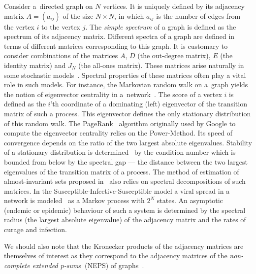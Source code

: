 \documentclass[a4paper]{article}
\theoremstyle{definition}
\begin{document}
Consider a~directed graph on \( N \) vertices.
It is uniquely defined by its
adjacency matrix
    \( A = (a_{ij}) \)
    of the size \( N\times N \),
    in which \( a_{ij} \)
    is the number of edges
    from the vertex \( i \)
    to the vertex \( j \).
The \emph{simple spectrum} of a graph
    is defined as the spectrum of its adjacency matrix.
Different spectra of a graph are defined in terms of different matrices
    corresponding to this graph.
It is customary to consider combinations
    of the matrices \( A \),
    \( D \) (the out-degree matrix),
    \( E \) (the identity matrix)
    and \( J_N \) (the all-ones matrix).
These matrices arise naturally
    in some stochastic models~\cite[p.~184]{cvetkovic2010introduction}.
Spectral  properties of these matrices
    often play a vital role in such models.
For instance, the Markovian random walk on a~graph
    yields the notion of eigenvector centrality
    in a~network~\cite{ilprints422,bonacich1972factoring}.
The score of a vertex \( i \)
    is defined as the \( i \)'th coordinate
    of a dominating (left) eigenvector
    of the transition matrix of such a process.
This eigenvector
    defines the only stationary distribution
    of this random walk.
The PageRank~\cite{ilprints422} algorithm
    originally used by Google
    to compute the eigenvector centrality
    relies on the Power-Method.
Its speed of convergence depends on
    the ratio of the two largest absolute eigenvalues.
Stability of a stationary distribution
    is determined~\cite{meyer1994sensitivity}
    by the condition number
    which is bounded from below
    by the spectral gap --- the distance between
    the two largest eigenvalues
    of the transition matrix of a process.
The method of estimation of almost-invariant sets
    proposed in~\cite{schwartz2006fluctuation}
    also relies on spectral decompositions of such matrices.
In the Susceptible-Infective-Susceptible model
    a viral spread in a network
    is modeled~\cite{wang2003epidemic,chakrabarti2008epidemic} as a Markov process
    with \( 2^N \) states.
An asymptotic (endemic or epidemic) behaviour of such a system
    is determined by the spectral radius (the largest absolute eigenvalue)
    of the adjacency matrix
    and the rates of curage and infection.

We should also note that the Kronecker products
    of the adjacency matrices
    are themselves of interest
    as they correspond to the adjacency matrices of
    the \emph{non-complete extended p-sum}s~(NEPS)
    of graphs~\cite[p.~44]{cvetkovic2010introduction}.
\end{document}
